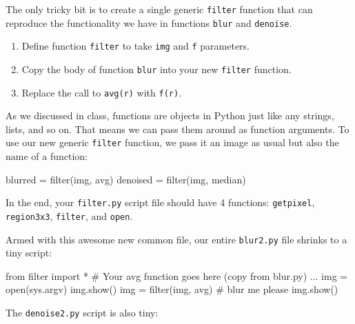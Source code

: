 \documentclass[titlepage]{tufte-book}
\begin{document}
The only tricky bit is to create a single generic {\tt filter} function that can reproduce the functionality we have in functions {\tt blur} and {\tt denoise}.

\begin{enumerate}
\item Define function {\tt filter} to take {\tt img} and {\tt f} parameters.
\item Copy the body of function {\tt blur} into your new {\tt filter} function.
\item Replace the call to {\tt avg(r)} with {\tt f(r)}.
\end{enumerate}

As we discussed in class, functions are objects in Python just like any strings, lists, and so on. That means we can pass them around as function arguments. To use our new generic {\tt filter} function, we pass it an image as usual but also the name of a function:

\begin{pyverbatim}
blurred  = filter(img, avg)
denoised = filter(img, median)
\end{pyverbatim}

In the end, your {\tt filter.py} script file should have 4 functions: {\tt getpixel}, {\tt region3x3}, {\tt filter}, and {\tt open}.

Armed with this awesome new common file, our entire {\tt blur2.py} file shrinks to a tiny script:

\begin{pyverbatim}
from filter import *
# Your avg function goes here (copy from blur.py)
...
img = open(sys.argv)
img.show()
img = filter(img, avg)		# blur me please
img.show()
\end{pyverbatim}

\noindent The {\tt denoise2.py} script is also tiny:
\end{document}
